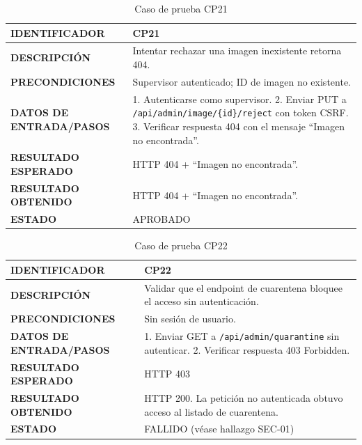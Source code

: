 \begin{table}[H]
\centering
\caption{Caso de prueba CP21}
\begin{tabular}{|p{3.5cm}|p{10.3cm}|}
\hline
\textbf{IDENTIFICADOR} & CP21 \\
\hline
\textbf{DESCRIPCIÓN} & Intentar rechazar una imagen inexistente retorna 404. \\
\hline
\textbf{PRECONDICIONES} & Supervisor autenticado; ID de imagen no existente. \\
\hline
\textbf{DATOS DE ENTRADA/PASOS} & 1. Autenticarse como supervisor. 2. Enviar PUT a \texttt{/api/admin/image/\{id\}/reject} con token CSRF. 3. Verificar respuesta 404 con el mensaje ``Imagen no encontrada''. \\
\hline
\textbf{RESULTADO ESPERADO} & HTTP 404 + ``Imagen no encontrada''. \\
\hline
\textbf{RESULTADO OBTENIDO} & HTTP 404 + ``Imagen no encontrada''. \\
\hline
\textbf{ESTADO} & APROBADO \\
\hline
\end{tabular}
\end{table}

\begin{table}[H]
\centering
\caption{Caso de prueba CP22}
\begin{tabular}{|p{3.5cm}|p{10.3cm}|}
\hline
\textbf{IDENTIFICADOR} & CP22 \\
\hline
\textbf{DESCRIPCIÓN} & Validar que el endpoint de cuarentena bloquee el acceso sin autenticación. \\
\hline
\textbf{PRECONDICIONES} & Sin sesión de usuario. \\
\hline
\textbf{DATOS DE ENTRADA/PASOS} & 1. Enviar GET a \texttt{/api/admin/quarantine} sin autenticar. 2. Verificar respuesta 403 Forbidden. \\
\hline
\textbf{RESULTADO ESPERADO} & HTTP 403 \\
\hline
\textbf{RESULTADO OBTENIDO} & HTTP 200. La petición no autenticada obtuvo acceso al listado de cuarentena. \\
\hline
\textbf{ESTADO} & FALLIDO (véase hallazgo SEC-01) \\
\hline
\end{tabular}
\end{table}

